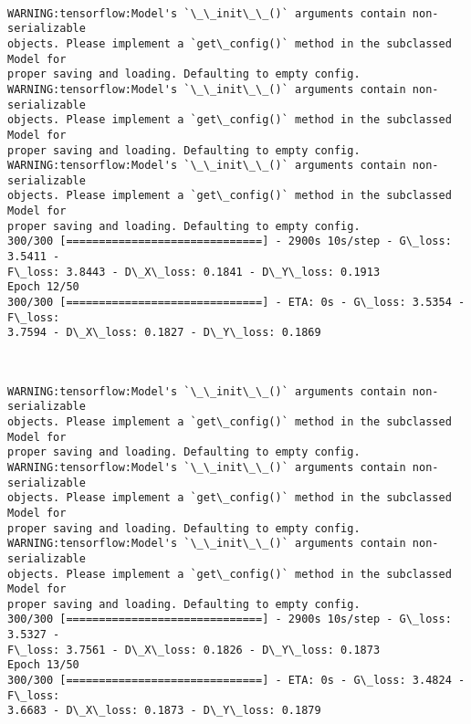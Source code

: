 \documentclass[11pt]{article}
\begin{document}
    \begin{center}
    \end{center}
    { \hspace*{\fill} \\}
    
    \begin{Verbatim}[commandchars=\\\{\}]
WARNING:tensorflow:Model's `\_\_init\_\_()` arguments contain non-serializable
objects. Please implement a `get\_config()` method in the subclassed Model for
proper saving and loading. Defaulting to empty config.
WARNING:tensorflow:Model's `\_\_init\_\_()` arguments contain non-serializable
objects. Please implement a `get\_config()` method in the subclassed Model for
proper saving and loading. Defaulting to empty config.
WARNING:tensorflow:Model's `\_\_init\_\_()` arguments contain non-serializable
objects. Please implement a `get\_config()` method in the subclassed Model for
proper saving and loading. Defaulting to empty config.
300/300 [==============================] - 2900s 10s/step - G\_loss: 3.5411 -
F\_loss: 3.8443 - D\_X\_loss: 0.1841 - D\_Y\_loss: 0.1913
Epoch 12/50
300/300 [==============================] - ETA: 0s - G\_loss: 3.5354 - F\_loss:
3.7594 - D\_X\_loss: 0.1827 - D\_Y\_loss: 0.1869
    \end{Verbatim}

    \begin{center}
    \end{center}
    { \hspace*{\fill} \\}
    
    \begin{Verbatim}[commandchars=\\\{\}]
WARNING:tensorflow:Model's `\_\_init\_\_()` arguments contain non-serializable
objects. Please implement a `get\_config()` method in the subclassed Model for
proper saving and loading. Defaulting to empty config.
WARNING:tensorflow:Model's `\_\_init\_\_()` arguments contain non-serializable
objects. Please implement a `get\_config()` method in the subclassed Model for
proper saving and loading. Defaulting to empty config.
WARNING:tensorflow:Model's `\_\_init\_\_()` arguments contain non-serializable
objects. Please implement a `get\_config()` method in the subclassed Model for
proper saving and loading. Defaulting to empty config.
300/300 [==============================] - 2900s 10s/step - G\_loss: 3.5327 -
F\_loss: 3.7561 - D\_X\_loss: 0.1826 - D\_Y\_loss: 0.1873
Epoch 13/50
300/300 [==============================] - ETA: 0s - G\_loss: 3.4824 - F\_loss:
3.6683 - D\_X\_loss: 0.1873 - D\_Y\_loss: 0.1879
    \end{Verbatim}
\end{document}
